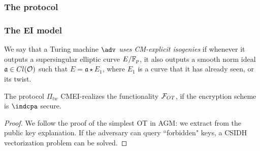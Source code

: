 \documentclass{beamer}
\begin{document}
    \begin{frame}
        \frametitle{The protocol}
        
        \begin{center}
        \end{center}

    \end{frame}

    \begin{frame}
        \frametitle{The EI model}
        
        \begin{definition}
            We say that a Turing machine $\adv$ \emph{uses CM-explicit isogenies} if whenever it outputs a supersingular elliptic curve $E/\mathbb{F}_p$, it also outputs a smooth norm ideal $\mathfrak a\in Cl(\mathcal{O})$ such that $E=\mathfrak a\star E_1$, where $E_1$ is a curve that it has already seen, or its twist.
        \end{definition}
    
        \begin{theorem}
            The protocol $\Pi_{tw}$ CMEI-realizes the functionality $\mathcal{F}_{OT}$, if the encryption scheme is $\indcpa$ secure.
        \end{theorem}
    
        \begin{proof}
            We follow the proof of the simplest OT in AGM: we extract from the public key explanation. If the adversary can query ``forbidden" keys, a CSIDH vectorization problem can be solved. 
        \end{proof}
    \end{frame}
\end{document}
